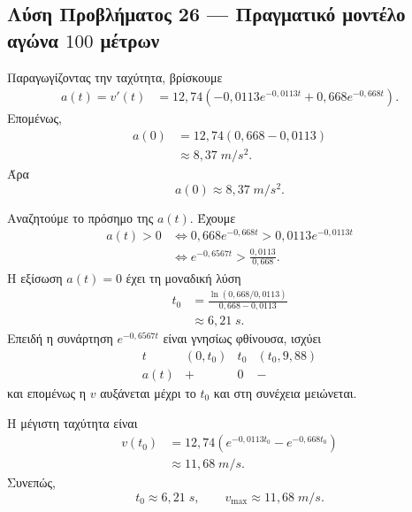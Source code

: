 \subsection*{Λύση Προβλήματος 26 --- Πραγματικό μοντέλο αγώνα $100$ μέτρων}

\begin{alist}
  \item Παραγωγίζοντας την ταχύτητα, βρίσκουμε
        \begin{align*}
          a(t)=v'(t)
          &=12{,}74\left(
            -0{,}0113e^{-0{,}0113t}
            +0{,}668e^{-0{,}668t}
          \right).
        \end{align*}
        Επομένως,
        \begin{align*}
          a(0)
          &=12{,}74(0{,}668-0{,}0113)\\
          &\approx8{,}37\;\si{m/s^2}.
        \end{align*}
        Άρα
        \[
          {a(0)\approx8{,}37\;\si{m/s^2}}.
        \]

  \item Αναζητούμε το πρόσημο της $a(t)$. Έχουμε
        \begin{align*}
          a(t)>0
          &\Leftrightarrow
          0{,}668e^{-0{,}668t}
          >0{,}0113e^{-0{,}0113t}\\
          &\Leftrightarrow
          e^{-0{,}6567t}>
          \frac{0{,}0113}{0{,}668}.
        \end{align*}
        Η εξίσωση $a(t)=0$ έχει τη μοναδική λύση
        \begin{align*}
          t_0
          &=\frac{\ln(0{,}668/0{,}0113)}{0{,}668-0{,}0113}\\
          &\approx6{,}21\;\si{s}.
        \end{align*}
        Επειδή η συνάρτηση $e^{-0{,}6567t}$ είναι γνησίως φθίνουσα,
        ισχύει
        \[
        \begin{array}{c|ccc}
          t &(0,t_0)&t_0&(t_0,9{,}88)\\ \hline
          a(t)&+&0&-
        \end{array}
        \]
        και επομένως η $v$ αυξάνεται μέχρι το $t_0$ και στη συνέχεια
        μειώνεται.

        Η μέγιστη ταχύτητα είναι
        \begin{align*}
          v(t_0)
          &=12{,}74\left(
            e^{-0{,}0113t_0}-e^{-0{,}668t_0}
          \right)\\
          &\approx11{,}68\;\si{m/s}.
        \end{align*}
        Συνεπώς,
        \[
          {t_0\approx6{,}21\;\si{s},
          \qquad v_{\max}\approx11{,}68\;\si{m/s}}.
        \]


\end{alist}
